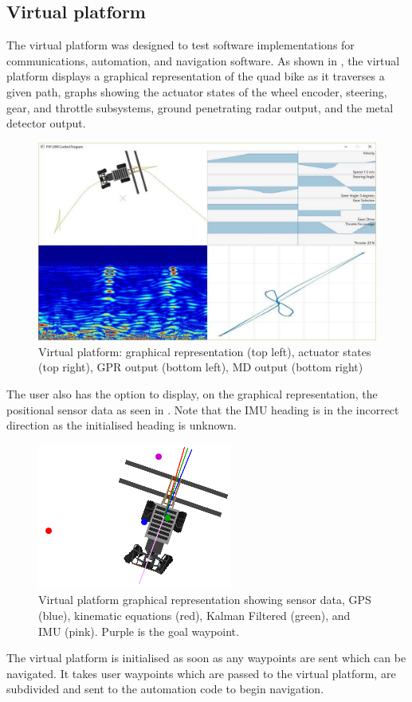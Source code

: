 \documentclass[main.tex]{subfiles}
\begin{document}
\subsection{Virtual platform}
The virtual platform was designed to test software implementations for communications, automation, and navigation software. As shown in , the virtual platform displays a graphical representation of the quad bike as it traverses a given path, graphs showing the actuator states of the wheel encoder, steering, gear, and throttle subsystems, ground penetrating radar output, and the metal detector output.
\begin{figure}[ht]
\includegraphics[width=\textwidth]{4-DetailedDesign/virtualPlatform.jpg}
\centering
\caption[Virtual platform display window]{Virtual platform: graphical representation (top left), actuator states (top right), GPR output (bottom left), MD output (bottom right)} 
\end{figure}
The user also has the option to display, on the graphical representation, the positional sensor data as seen in . Note that the IMU heading is in the incorrect direction as the initialised heading is unknown.
\begin{figure}[ht]
\includegraphics[]{4-DetailedDesign/dataVisibleVirtualPlatform.PNG}
\centering
\caption[Virtual platform graphical representation]{Virtual platform graphical representation showing sensor data, GPS (blue), kinematic equations (red), Kalman Filtered (green), and IMU (pink). Purple is the goal waypoint.} 
\end{figure}
The virtual platform is initialised as soon as any waypoints are sent which can be navigated. It takes user waypoints which are passed to the virtual platform, are subdivided and sent to the automation code to begin navigation.
\end{document}
